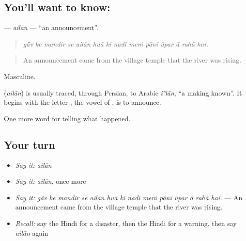 \subsection*{You'll want to know: }
\textbf{} — \emph{ailān} — \textquotedblleft{}an announcement\textquotedblright{}.

\begin{quote}
             
\end{quote}

\begin{quote}
\emph{gā̃v ke mandir se ailān huā ki nadī meṁ pānī ūpar ā rahā hai.}
\end{quote}

\begin{quote}
An announcement came from the village temple that the river was rising.
\end{quote}

Masculine.

\begin{cousinweb}
\textbf{} (\emph{ailān}) is usually traced, through Persian, to Arabic \emph{iʿlān}, \textquotedblleft{}a making known\textquotedblright{}. It begins with the letter \textbf{}, the vowel of \textbf{}. \textbf{ } is to announce.
\end{cousinweb}

\begin{grammarlens}[title={What you've built}]
One more word for telling what happened.
\end{grammarlens}

\subsection*{Your turn}
\begin{itemize}
\raggedright
  \item \emph{Say it:} \emph{ailān}
  \item \emph{Say it:} \emph{ailān}, once more
  \item \emph{Say it:} \emph{gā̃v ke mandir se ailān huā ki nadī meṁ pānī ūpar ā rahā hai.} — An announcement came from the village temple that the river was rising.
  \item \emph{Recall:} say the Hindi for a disaster, then the Hindi for a warning, then say \emph{ailān} again
\end{itemize}


